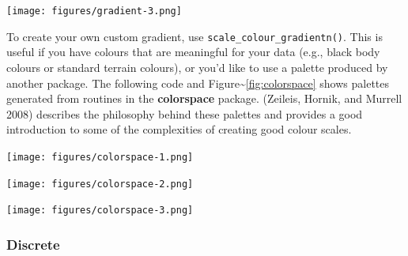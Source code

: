 \texttt{[image: figures/gradient-3.png]}

To create your own custom gradient, use
\texttt{scale\_colour\_gradientn()}. This is useful if you have colours
that are meaningful for your data (e.g., black body colours or standard
terrain colours), or you'd like to use a palette produced by another
package. The following code and
Figure\textasciitilde{}\ref{fig:colorspace} shows palettes generated
from routines in the \textbf{colorspace} package. (Zeileis, Hornik, and
Murrell 2008) describes the philosophy behind these palettes and
provides a good introduction to some of the complexities of creating
good colour scales. 
 

\begin{Shaded}
\begin{Highlighting}[]
\NormalTok{(}\NormalTok{)}
\StringTok{ }
  \NormalTok{(} \NormalTok{(}\NormalTok{), } \NormalTok{(}\NormalTok{, }\NormalTok{))}
\NormalTok{\}}
\StringTok{ }
\end{Highlighting}
\end{Shaded}

\texttt{[image: figures/colorspace-1.png]}

\begin{Shaded}
\begin{Highlighting}[]
\StringTok{ }
\end{Highlighting}
\end{Shaded}

\texttt{[image: figures/colorspace-2.png]}

\begin{Shaded}
\begin{Highlighting}[]
\StringTok{ }
\end{Highlighting}
\end{Shaded}

\texttt{[image: figures/colorspace-3.png]}

\subsubsection{Discrete}\label{ssub:colour-discrete}

